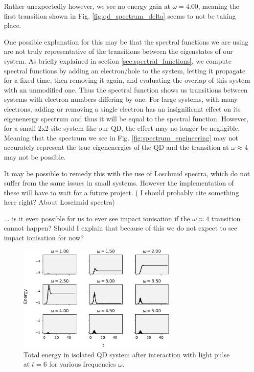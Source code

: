 \medskip

Rather unexpectedly however, we see no energy gain at $\omega = 4.00$, meaning the first transition shown in Fig. \ref{fig:qd_spectrum_delta} seems to not be taking place.

\medskip

One possible explanation for this may be that the spectral functions we are using are not truly representative of the transitions between the eigenstates of our system. As briefly explained in section \ref{sec:spectral_functions}, we compute spectral functions by adding an electron/hole to the system, letting it propagate for a fixed time, then removing it again, and evaluating the overlap of this system with an unmodified one. Thus the spectral function shows us transitions between systems with electron numbers differing by one. For large systems, with many electrons, adding or removing a single electron has an insignificant effect on its eigenenergy spectrum and thus it will be equal to the spectral function. However, for a small 2x2 site system like our QD, the effect may no longer be negligible. Meaning that the spectrum we see in Fig. \ref{fig:spectrum_engineering} may not accurately represent the true eigenenergies of the QD and the transition at $\omega\approx 4$ may not be possible.

\medskip
It may be possible to remedy this with the use of Loschmid spectra, which do not suffer from the same issues in small systems. However the implementation of these will have to wait for a future project. ({\color{red} I should probably cite something here right? About Loschmid spectra})

\medskip
{\color{green}... is it even possible for us to ever see impact ionisation if the $\omega \approx 4$ transition cannot happen? Should I explain that because of this we do not expect to see impact ionisation for now?} 

\begin{figure}[!hbt]
    \centering
    \includegraphics[width=0.7\textwidth]{graph/9test.pdf}
    \caption{Total energy in isolated QD system after interaction with light pulse at $t=6$ for various frequencies $\omega$.}
    \label{fig:qd_9_total_energy}
\end{figure}